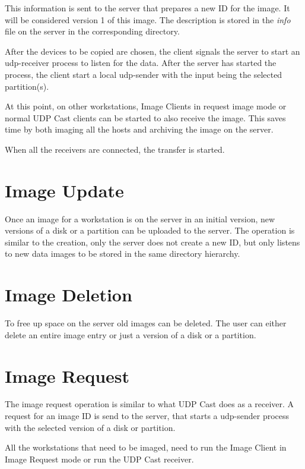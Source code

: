 This information is sent to the server that prepares a new ID for the
image. It will be considered version 1 of this image. The description is
stored in the \emph{info} file on the server in the corresponding directory.

After the devices to be copied are chosen, the client signals the server to
start an udp-receiver process to listen for the data. After the server has
started the process, the client start a local udp-sender with the input
being the selected partition(s).

At this point, on other workstations, Image Clients in request image mode
or normal UDP Cast clients can be started to also receive the image. This
saves time by both imaging all the hosts and archiving the image on the
server.

When all the receivers are connected, the transfer is started.

\section{Image Update}

Once an image for a workstation is on the server in an initial version, new
versions of a disk or a partition can be uploaded to the server. The
operation is similar to the creation, only the server does not create a new
ID, but only listens to new data images to be stored in the same directory
hierarchy.

\section{Image Deletion}

To free up space on the server old images can be deleted. The user can either
delete an entire image entry or just a version of a disk or a partition.

\section{Image Request}

The image request operation is similar to what UDP Cast does as a receiver.
A request for an image ID is send to the server, that starts a udp-sender
process with the selected version of a disk or partition.

All the workstations that need to be imaged, need to run the Image Client
in Image Request mode or run the UDP Cast receiver.
